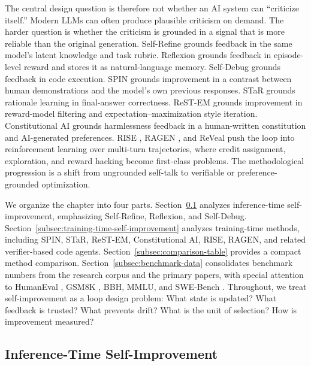 The central design question is therefore not whether an AI system can ``criticize itself.'' Modern LLMs can often produce plausible criticism on demand. The harder question is whether the criticism is grounded in a signal that is more reliable than the original generation. Self-Refine \cite{madaan2023selfrefine} grounds feedback in the same model's latent knowledge and task rubric. Reflexion \cite{shinn2023reflexion} grounds feedback in episode-level reward and stores it as natural-language memory. Self-Debug \cite{singh2023selfdebug} grounds feedback in code execution. SPIN \cite{singh2024beyond} grounds improvement in a contrast between human demonstrations and the model's own previous responses. STaR \cite{zelikman2022star} grounds rationale learning in final-answer correctness. ReST-EM \cite{singh2024beyond} grounds improvement in reward-model filtering and expectation--maximization style iteration. Constitutional AI \cite{bai2022constitutional} grounds harmlessness feedback in a human-written constitution and AI-generated preferences. RISE \cite{qu2024rise}, RAGEN \cite{wang2025ragen}, and ReVeal \cite{jin2025reveal} push the loop into reinforcement learning over multi-turn trajectories, where credit assignment, exploration, and reward hacking become first-class problems. The methodological progression is a shift from ungrounded self-talk to verifiable or preference-grounded optimization.

We organize the chapter into four parts. Section~\ref{subsec:inference-time-self-improvement} analyzes inference-time self-improvement, emphasizing Self-Refine, Reflexion, and Self-Debug. Section~\ref{subsec:training-time-self-improvement} analyzes training-time methods, including SPIN, STaR, ReST-EM, Constitutional AI, RISE, RAGEN, and related verifier-based code agents. Section~\ref{subsec:comparison-table} provides a compact method comparison. Section~\ref{subsec:benchmark-data} consolidates benchmark numbers from the research corpus and the primary papers, with special attention to HumanEval \cite{humaneval2021}, GSM8K \cite{gsm8k2021}, BBH, MMLU, and SWE-Bench \cite{swebench2023}. Throughout, we treat self-improvement as a loop design problem: What state is updated? What feedback is trusted? What prevents drift? What is the unit of selection? How is improvement measured?

\subsection{Inference-Time Self-Improvement}
\label{subsec:inference-time-self-improvement}

